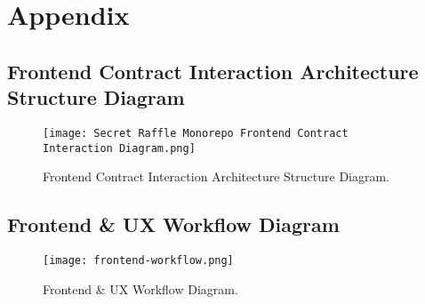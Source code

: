 \documentclass[9pt]{extarticle}
\begin{document}
\section{Appendix}

\subsection{Frontend Contract Interaction Architecture Structure Diagram}
\begin{figure}[h]
  \vspace{-0.5cm}
  \hspace{-2cm}
  \texttt{[image: Secret Raffle Monorepo Frontend Contract Interaction Diagram.png]}
  \caption{Frontend Contract Interaction Architecture Structure Diagram.}
  \label{fig:Frontend Contract Interaction Architecture Structure Diagram Appendix}
\end{figure}

\newpage

\subsection{Frontend \& UX Workflow Diagram}
\begin{figure}[h]
  \vspace{0cm}
  \hspace{0cm}
  \texttt{[image: frontend-workflow.png]}
  \caption{Frontend \& UX Workflow Diagram.}
  \label{fig:Frontend Workflow Appendix}
\end{figure}

\newpage
\end{document}
